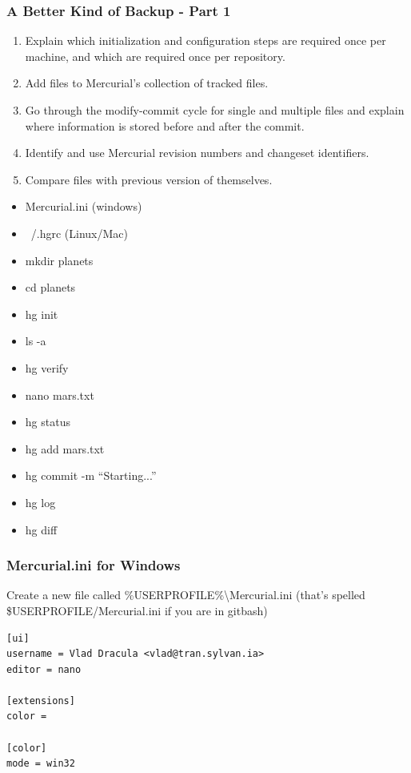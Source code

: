 \documentclass[xcolor=dvipsnames]{beamer}
\begin{document}
\begin{frame}[label=part1]
\frametitle{A Better Kind of Backup - Part 1}
\begin{enumerate}
\item Explain which initialization and configuration steps are required once per machine, and which are required once per repository.
\item Add files to Mercurial's collection of tracked files.
\item Go through the modify-commit cycle for single and multiple files and explain where information is stored before and after the commit.
\item Identify and use Mercurial revision numbers and changeset identifiers.
\item Compare files with previous version of themselves.
\end{enumerate}

\begin{multicols}{2}
\begin{itemize}
\item Mercurial.ini (windows)
\item ~/.hgrc (Linux/Mac)
\item mkdir planets
\item cd planets
\item hg init
\item ls -a
\item hg verify
\item nano mars.txt
\item hg status
\item hg add mars.txt
\item hg commit -m ``Starting...''
\item hg log
\item hg diff
\end{itemize}
\end{multicols}
\end{frame}

\begin{frame}[fragile]
\frametitle{Mercurial.ini for Windows}
Create a new file called \%USERPROFILE\%\textbackslash Mercurial.ini (that's spelled \$USERPROFILE/Mercurial.ini if you are in gitbash)
\begin{verbatim}
[ui]
username = Vlad Dracula <vlad@tran.sylvan.ia>
editor = nano

[extensions]
color =

[color]
mode = win32
\end{verbatim}
\end{frame}
\end{document}
